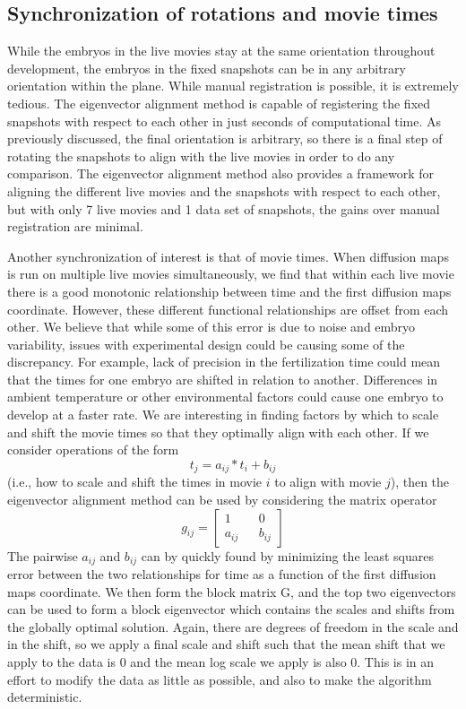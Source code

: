 \documentclass[12pt]{article}
\begin{document}
\subsection{Synchronization of rotations and movie times}

While the embryos in the live movies stay at the same orientation throughout development, the embryos in the fixed snapshots can be in any arbitrary orientation within the plane. While manual registration is possible, it is extremely tedious. The eigenvector alignment method is capable of registering the fixed snapshots with respect to each other in just seconds of computational time. As previously discussed, the final orientation is arbitrary, so there is a final step of rotating the snapshots to align with the live movies in order to do any comparison. The eigenvector alignment method also provides a framework for aligning the different live movies and the snapshots with respect to each other, but with only 7 live movies and 1 data set of snapshots, the gains over manual registration are minimal. \vspace{1mm}

Another synchronization of interest is that of movie times.  When diffusion maps is run on multiple live movies simultaneously, we find that within each live movie there is a good monotonic relationship between time and the first diffusion maps coordinate. However, these different functional relationships are offset from each other. We believe that while some of this error is due to noise and embryo variability, issues with experimental design could be causing some of the discrepancy. For example, lack of precision in the fertilization time could mean that the times for one embryo are shifted in relation to another. Differences in ambient temperature or other environmental factors could cause one embryo to develop at a faster rate. We are interesting in finding factors by which to scale and shift the movie times so that they optimally align with each other. If we consider operations of the form
\[
t_j = a_{ij}*t_i+b_{ij}
\]
(i.e., how to scale and shift the times in movie $i$ to align with movie $j$), then the eigenvector alignment method can be used by considering the matrix operator
\[
g_{ij}=
\begin{bmatrix}
1 && 0\\
a_{ij} && b_{ij}
\end{bmatrix}
\]
The pairwise $a_{ij}$ and $b_{ij}$ can by quickly found by minimizing the least squares error between the two relationships for time as a function of the first diffusion maps coordinate. We then form the block matrix G, and the top two eigenvectors can be used to form a block eigenvector which contains the scales and shifts from the globally optimal solution. Again, there are degrees of freedom in the scale and in the shift, so we apply a final scale and shift such that the mean shift that we apply to the data is 0 and the mean log scale we apply is also 0. This is in an effort to modify the data as little as possible, and also to make the algorithm deterministic.
\end{document}

